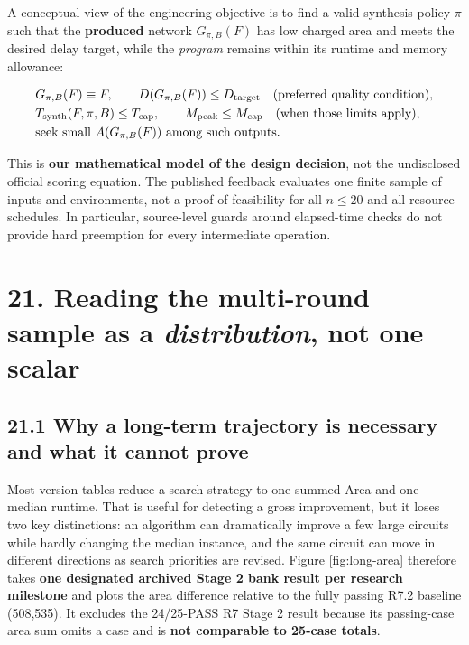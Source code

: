 A conceptual view of the engineering objective is to find a valid synthesis policy \(\pi\) such that the \textbf{produced} network \(G_{\pi,B}(F)\) has low charged area and meets the desired delay target, while the \emph{program} remains within its runtime and memory allowance:

\[
\begin{aligned}
& G_{\pi,B}(F)\equiv F,\qquad D(G_{\pi,B}(F))\le D_{\rm target}\quad\text{(preferred quality condition)},\\
& T_{\rm synth}(F,\pi,B)\le T_{\rm cap},\qquad M_{\rm peak}\le M_{\rm cap}
\quad\text{(when those limits apply)},\\
&\text{seek small } A(G_{\pi,B}(F))\text{ among such outputs.}
\end{aligned}
\]

This is \textbf{our mathematical model of the design decision}, not the undisclosed official scoring equation. The published feedback evaluates one finite sample of inputs and environments, not a proof of feasibility for all \(n\le20\) and all resource schedules. In particular, source-level guards around elapsed-time checks do not provide hard preemption for every intermediate operation.

\section{\texorpdfstring{21. Reading the multi-round sample as a \emph{distribution}, not one scalar}{21. Reading the multi-round sample as a distribution, not one scalar}}\label{reading-the-multi-round-sample-as-a-distribution-not-one-scalar}

\subsection{21.1 Why a long-term trajectory is necessary and what it cannot prove}\label{why-a-long-term-trajectory-is-necessary-and-what-it-cannot-prove}

Most version tables reduce a search strategy to one summed Area and one median runtime. That is useful for detecting a gross improvement, but it loses two key distinctions: an algorithm can dramatically improve a few large circuits while hardly changing the median instance, and the same circuit can move in different directions as search priorities are revised. Figure \ref{fig:long-area} therefore takes \textbf{one designated archived Stage 2 bank result per research milestone} and plots the area difference relative to the fully passing R7.2 baseline (508,535). It excludes the 24/25-PASS R7 Stage 2 result because its passing-case area sum omits a case and is \textbf{not comparable to 25-case totals}.

